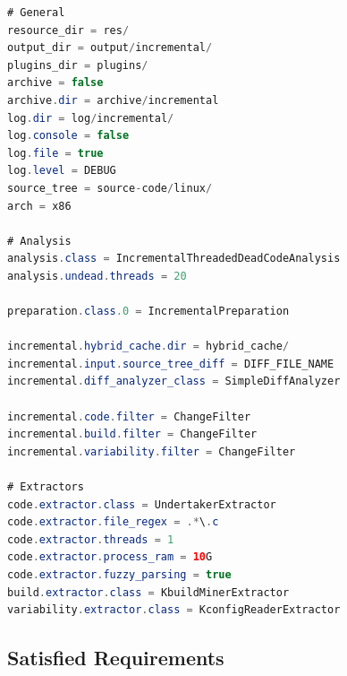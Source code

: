 \documentclass[a4paper]{article}
\begin{document}
\begin{lstlisting}[language=java]
# General
resource_dir = res/
output_dir = output/incremental/
plugins_dir = plugins/
archive = false
archive.dir = archive/incremental
log.dir = log/incremental/
log.console = false
log.file = true
log.level = DEBUG
source_tree = source-code/linux/
arch = x86

# Analysis  
analysis.class = IncrementalThreadedDeadCodeAnalysis
analysis.undead.threads = 20

preparation.class.0 = IncrementalPreparation

incremental.hybrid_cache.dir = hybrid_cache/
incremental.input.source_tree_diff = DIFF_FILE_NAME
incremental.diff_analyzer_class = SimpleDiffAnalyzer

incremental.code.filter = ChangeFilter
incremental.build.filter = ChangeFilter
incremental.variability.filter = ChangeFilter

# Extractors  
code.extractor.class = UndertakerExtractor
code.extractor.file_regex = .*\.c
code.extractor.threads = 1
code.extractor.process_ram = 10G
code.extractor.fuzzy_parsing = true
build.extractor.class = KbuildMinerExtractor
variability.extractor.class = KconfigReaderExtractor
\end{lstlisting}

\clearpage

\subsection{Satisfied Requirements}
\end{document}
